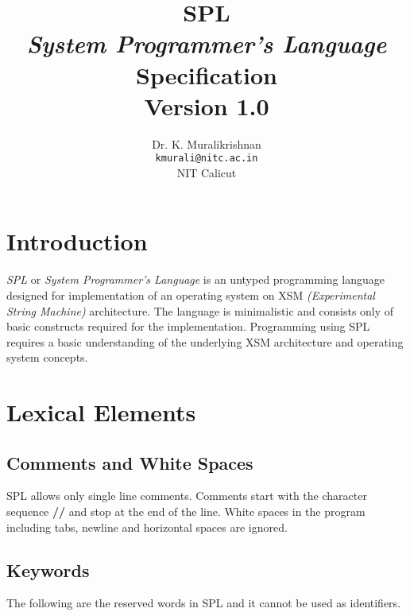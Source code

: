 \documentclass[11pt]{article}
\title{SPL \\ \textit{System Programmer's Language} \\ Specification \\
Version 1.0}
\author{Dr. K. Muralikrishnan  \\ \texttt{kmurali@nitc.ac.in} \\ {NIT Calicut} }
\begin{document}
 \newcommand{\kw}[1]{\texttt{#1}}

\maketitle

\pagebreak
\thispagestyle{plain}

\tableofcontents
\pagebreak


\section{Introduction}
\paragraph{}
\textit{SPL} or \textit{System Programmer's  Language} is an untyped programming language designed for implementation of an operating system on XSM \textit{(Experimental String Machine)} architecture. The language is minimalistic and consists only of basic constructs required for the implementation. Programming using SPL requires a  basic understanding of the underlying XSM architecture and operating system concepts. 



\section{Lexical Elements}




\subsection{Comments and White Spaces}

SPL allows only single line comments. Comments start with the character sequence \textbf{//} and stop at the end of the line. White spaces in the program including tabs, newline and horizontal spaces are ignored.


\subsection{Keywords}
The following are the reserved words in SPL and it cannot be used as identifiers.
\end{document}
